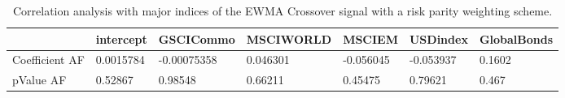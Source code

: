 \begin{table}[H]
\centering
\begin{tabular}{lllllll}
& intercept & GSCICommo & MSCIWORLD & MSCIEM & USDindex & GlobalBonds \\ 
\hline 
Coefficient AF & 0.0015784 & -0.00075358 & 0.046301 & -0.056045 & -0.053937 & 0.1602 \\ 
pValue AF & 0.52867 & 0.98548 & 0.66211 & 0.45475 & 0.79621 & 0.467 \\ 
\hline
\end{tabular}
\caption{Correlation analysis with major indices of the EWMA Crossover signal with a risk parity weighting scheme.}
\label{MBBSRPNR_AFACTOR}
\end{table}